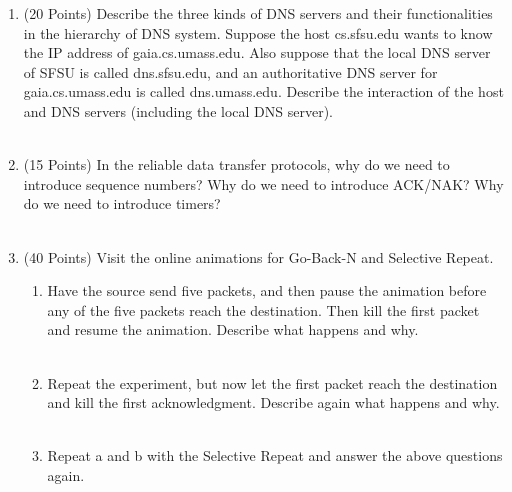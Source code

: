 \documentclass[11pt]{article}
\begin{document}
\begin{enumerate}
    \item (20 Points) Describe the three kinds of DNS servers and their functionalities in the
    hierarchy of DNS system. Suppose the host cs.sfsu.edu wants to know the IP address of
    gaia.cs.umass.edu. Also suppose that the local DNS server of SFSU is called dns.sfsu.edu,
    and an authoritative DNS server for gaia.cs.umass.edu is called dns.umass.edu. Describe
    the interaction of the host and DNS servers (including the local DNS server). \\\\ \answerOne

    \item (15 Points) In the reliable data transfer protocols, why do we need to introduce sequence
    numbers? Why do we need to introduce ACK/NAK? Why do we need to introduce timers? \\\\ \answerTwo
    
    \item (40 Points) Visit the online animations for Go-Back-N and Selective Repeat.
        \begin{enumerate}[label=(\alph*)]
            \item Have the source send five packets, and then pause the animation before any of the five
            packets reach the destination. Then kill the first packet and resume the animation.
            Describe what happens and why. \\\\ \answerThreePartOne
            \item Repeat the experiment, but now let the first packet reach the destination and kill the
            first acknowledgment. Describe again what happens and why. \\\\ \answerThreePartTwo
            \item Repeat a and b with the Selective Repeat and answer the above questions again. \\\\ \answerThreePartThree
        \end{enumerate}
    

\end{enumerate}
\end{document}
